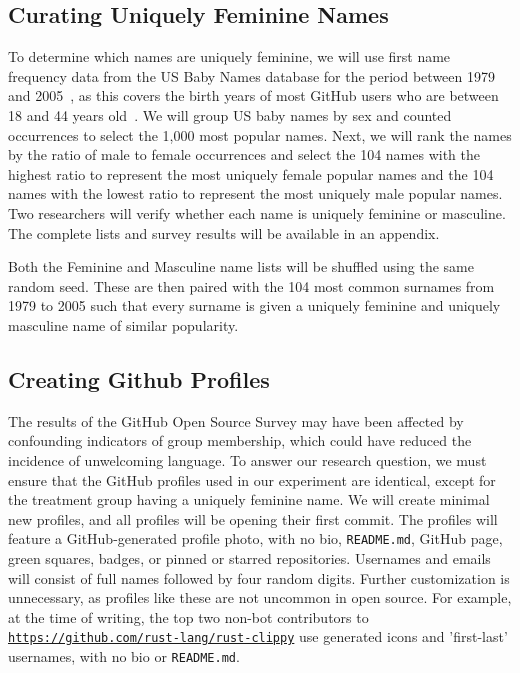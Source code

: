 \documentclass[journal,12pt,onecolumn,]{IEEEtran}
\begin{document}
\subsection{Curating Uniquely Feminine Names}

To determine which names are uniquely feminine, we will use first name frequency data from the US Baby Names database for the period between 1979 and 2005~\cite{names}, 
as this covers the birth years of most GitHub users who are between 18 and 44 years old~\cite{geiger17}. 
We will group US baby names by sex and counted occurrences to select the 1,000 most popular names. 
Next, we will rank the names by the ratio of male to female occurrences and select the 104 names with the highest ratio to represent the most uniquely female popular names and the 104 names with the lowest ratio to represent the most uniquely male popular names. 
Two researchers will verify whether each name is uniquely feminine or masculine. The complete lists and survey results will be available in an appendix.

Both the Feminine and Masculine name lists will be shuffled using the same random seed.
These are then paired with the 104 most common surnames from 1979 to 2005 such that every surname is given a uniquely feminine and uniquely masculine name of similar popularity.

\subsection{Creating Github Profiles}

The results of the GitHub Open Source Survey may have been affected by confounding indicators of group membership, which could have reduced the incidence of unwelcoming language. 
To answer our research question, we must ensure that the GitHub profiles used in our experiment are identical, except for the treatment group having a uniquely feminine name. 
We will create minimal new profiles, and all profiles will be opening their first commit. The profiles will feature a GitHub-generated profile photo, with no bio, \texttt{README.md}, 
GitHub page, green squares, badges, or pinned or starred repositories. Usernames and emails will consist of full names followed by four random digits. 
Further customization is unnecessary, as profiles like these are not uncommon in open source. For example, at the time of writing, the top two non-bot contributors to \href{https://github.com/rust-lang/rust-clippy}{\texttt{https://github.com/rust-lang/rust-clippy}} use generated icons and 'first-last' usernames, with no bio or \texttt{README.md}.
\end{document}

